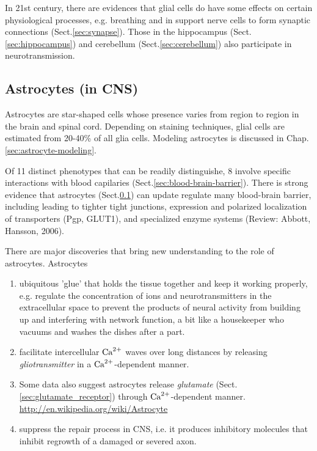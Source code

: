 In 21st century, there are evidences that glial cells do have some effects on
certain physiological processes, e.g. breathing and in support nerve cells to
form synaptic connections (Sect.\ref{sec:synapse}). Those in the hippocampus
(Sect.\ref{sec:hippocampus}) and cerebellum (Sect.\ref{sec:cerebellum}) also
participate in neurotransmission.

\subsection{Astrocytes (in CNS)}
\label{sec:astrocytes}

Astrocytes are star-shaped cells whose presence varies from region to region in
the brain and spinal cord. Depending on staining techniques, glial cells are
estimated from 20-40\% of all glia cells. Modeling astrocytes is discussed in
Chap.\ref{sec:astrocyte-modeling}.

Of 11 distinct phenotypes that can be readily distinguishe, 8 involve specific
interactions with blood capilaries (Sect.\ref{sec:blood-brain-barrier}).
There is strong evidence that astrocytes (Sect.\ref{sec:astrocytes}) can update
regulate many blood-brain barrier, including leading to tighter tight junctions, 
expression and polarized localization of transporters (Pgp, GLUT1), and
specialized enzyme systems (Review: Abbott, Hansson, 2006).

There are major discoveries that bring new understanding to the role of
astrocytes. Astrocytes
\begin{enumerate}
  \item ubiquitous 'glue' that holds the tissue together and keep it working
  properly, e.g. regulate the concentration of ions and neurotransmitters in the
  extracellular space to prevent the products of neural activity from building
  up and interfering with network function, a bit like a housekeeper who vacuums
  and washes the dishes after a part.
  
  
  \item  facilitate intercellular ${\text{Ca}^{2+}}$ waves over long distances by releasing
  {\it gliotransmitter} in a ${\text{Ca}^{2+}}$-dependent manner.

  \item  Some data also suggest astrocytes release {\it glutamate}
(Sect.\ref{sec:glutamate_receptor}) through ${\text{Ca}^{2+}}$-dependent manner.
\url{http://en.wikipedia.org/wiki/Astrocyte}
  
  \item
  suppress the repair process in CNS, i.e. it produces inhibitory molecules that
  inhibit regrowth of a damaged or severed axon.
\end{enumerate}

